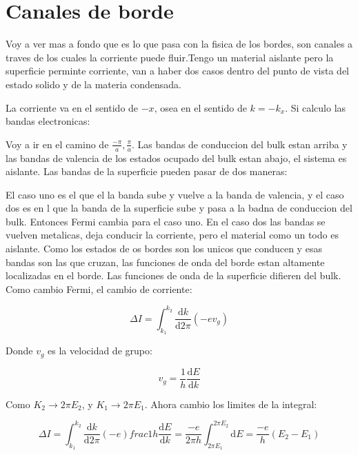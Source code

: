 \documentclass[11pt,fleqn]{book}
\begin{document}
\section{Canales de borde}

Voy a ver mas a fondo que es lo que pasa con la fisica de los bordes, son canales a traves de los cuales la corriente puede fluir.Tengo un material aislante pero la superficie perminte corriente, van a haber dos casos dentro del punto de vista del estado solido y de la materia condensada. 


La corriente va en el sentido de $-x$, osea en el sentido de $k=-k_{x}$. Si calculo las bandas electronicas:


Voy a ir en el camino de $\frac{-\pi}{a},\frac{\pi}{a}$. Las bandas de conduccion del bulk estan arriba y las bandas de valencia de los estados ocupado del bulk estan abajo, el sistema es aislante. Las bandas de la superficie pueden pasar de dos maneras:

El caso uno es el que el la banda sube y vuelve a la banda de valencia, y el caso dos es en l que la banda de la superficie sube y pasa a la badna de conduccion del bulk. Entonces Fermi cambia para el caso uno. En el caso dos las bandas se vuelven metalicas, deja conducir la corriente, pero el material como un todo es aislante. Como los estados de os bordes son los unicos que conducen y esas bandas son las que cruzan, las funciones de onda del borde estan altamente localizadas en el borde. Las funciones de onda de la superficie difieren del bulk. Como cambio Fermi, el cambio de corriente:

\begin{equation}
    \Delta I=\int_{k_{1}}^{k_{2}}\frac{\mathrm{d}k}{\mathrm{d}2\pi}(-ev_{g})
\end{equation}  

Donde $v_{g}$ es la velocidad de grupo:

\begin{equation}
    v_{g}=\frac{1}{h}\frac{\mathrm{d}E}{\mathrm{d}k}
\end{equation}

Como $K_{2}\rightarrow2\pi E_{2}$, y $K_{1}\rightarrow2\pi E_{1}$. Ahora cambio los limites de la integral:

\begin{equation}
    \Delta I=\int_{k_{1}}^{k_{2}}\frac{\mathrm{d}k}{\mathrm{d}2\pi}(-e)frac{1}{h}\frac{\mathrm{d}E}{\mathrm{d}k}=\frac{-e}{2\pi h}\int_{2\pi E_{1}}^{2\pi E_{2}}\mathrm{d}E=\frac{-e}{h}(E_{2}-E_{1})
\end{equation}   
\end{document}
